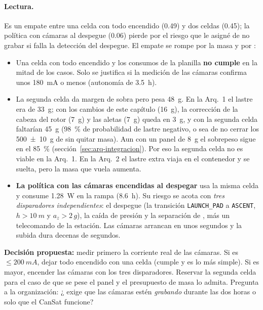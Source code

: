 \paragraph{Lectura.} Es un empate entre una celda con todo encendido (\num{0.49}) y dos celdas
(\num{0.45}); la política con cámaras al despegue (\num{0.06}) pierde por el riesgo que le asigné de
no grabar si falla la detección del despegue. El empate se rompe por la masa y por :
\begin{itemize}[leftmargin=*]
  \item Una celda con todo encendido y los consumos de la planilla \textbf{no cumple}
         en la mitad de los casos. Solo se justifica si la medición de las cámaras
        confirma unos \SI{180}{mA} o menos (autonomía de \SI{3.5}{h}).
  \item La segunda celda da margen de sobra pero pesa \SI{48}{g}. En la Arq.~1 el lastre era de
        \SI{33}{g}; con los cambios de este capítulo (\SI{+16}{g}), la corrección de la cabeza del rotor
        (\SI{+7}{g}) y las aletas (\SI{+7}{g}) queda en \SI{3}{g}, y con la segunda celda faltarían
        \SI{45}{g} (\SI{98}{\percent} de probabilidad de lastre negativo, o sea de no cerrar los \SI{500 \pm 10}{g} de  sin quitar masa).
        Aun con un panel de \SI{8}{g} el sobrepeso sigue en el \SI{85}{\percent} (sección~\ref{sec:arq-integracion}).
        Por eso la segunda celda no es viable en la Arq.~1. En la Arq.~2 el lastre extra viaja en el
        contenedor y se suelta, pero la masa que vuela aumenta.
  \item \textbf{La política con las cámaras encendidas al despegar} usa la
        misma celda y consume \SI{1.28}{W} en la rampa (\SI{8.6}{h}). Su riesgo se acota con
        \emph{tres disparadores independientes}: el despegue (la transición \texttt{LAUNCH\_PAD} a
        \texttt{ASCENT}, $h>\SI{10}{m}$ y $a_z>2\,g$), la caída de presión y la separación de
        , más un telecomando de la estación. Las cámaras arrancan en unos segundos y la
        subida dura decenas de segundos.
\end{itemize}
\textbf{Decisión propuesta:} medir primero la corriente real de las cámaras. Si es
$\le\SI{200}{mA}$, dejar todo encendido con una celda (cumple y es lo más simple). Si es
mayor, encender las cámaras con los tres disparadores. Reservar la segunda celda para el caso de
que se pese el panel y el presupuesto de masa lo admita. Pregunta a la organización: ¿ exige que las cámaras
estén \emph{grabando} durante las dos horas o solo que el CanSat funcione?

